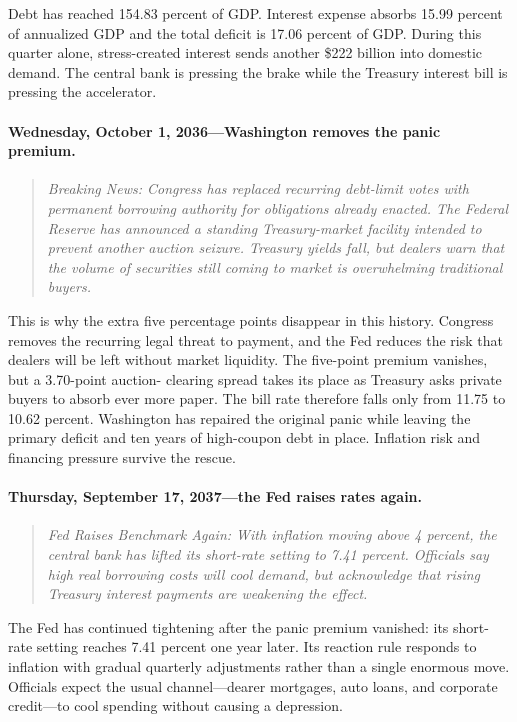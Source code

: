 \documentclass[11pt]{article}
\begin{document}
Debt has reached 154.83 percent of GDP.  Interest expense absorbs 15.99 percent of annualized
GDP and the total deficit is 17.06 percent of GDP.  During this quarter alone, stress-created
interest sends another \$222 billion into domestic demand.  The central bank is pressing the
brake while the Treasury interest bill is pressing the accelerator.

\paragraph{Wednesday, October 1, 2036---Washington removes the panic premium.}

\begin{quote}
\small\itshape
Breaking News: Congress has replaced recurring debt-limit votes with permanent borrowing
authority for obligations already enacted.  The Federal Reserve has announced a standing
Treasury-market facility intended to prevent another auction seizure.  Treasury yields fall,
but dealers warn that the volume of securities still coming to market is overwhelming
traditional buyers.
\end{quote}

This is why the extra five percentage points disappear in this history.  Congress removes
the recurring legal threat to payment, and the Fed reduces the risk that dealers will be
left without market liquidity.  The five-point premium vanishes, but a 3.70-point auction-
clearing spread takes its place as Treasury asks private buyers to absorb ever more paper.
The bill rate therefore falls only from 11.75 to 10.62 percent.  Washington has repaired the
original panic while leaving the primary deficit and ten years of high-coupon debt in place.
Inflation risk and financing pressure survive the rescue.

\paragraph{Thursday, September 17, 2037---the Fed raises rates again.}

\begin{quote}
\small\itshape
Fed Raises Benchmark Again: With inflation moving above 4 percent, the central bank has
lifted its short-rate setting to 7.41 percent.  Officials say high real borrowing costs will
cool demand, but acknowledge that rising Treasury interest payments are weakening the effect.
\end{quote}

The Fed has continued tightening after the panic premium vanished: its short-rate setting
reaches 7.41 percent one year later.  Its reaction rule
responds to inflation with gradual quarterly adjustments rather than a single enormous move.
Officials expect the usual channel---dearer mortgages, auto loans, and corporate credit---to
cool spending without causing a depression.
\end{document}
